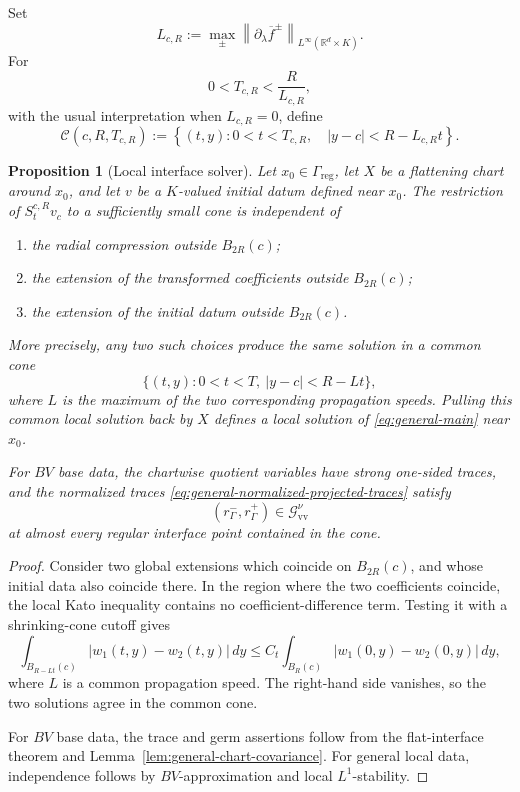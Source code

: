 \documentclass[11pt]{amsart}
\numberwithin{equation}{section}
\theoremstyle{plain}
\newtheorem{proposition}[theorem]{Proposition}
\theoremstyle{definition}
\theoremstyle{remark}
\begin{document}
Set
\begin{equation}
\label{eq:general-local-speed}
    L_{c,R}
    :=
    \max_\pm
    \left\|
        \partial_\lambda\overline f^\pm
    \right\|_{L^\infty(\mathbb R^d\times K)}.
\end{equation}
For
\[
    0<T_{c,R}<\frac{R}{L_{c,R}},
\]
with the usual interpretation when \(L_{c,R}=0\), define
\begin{equation}
\label{eq:general-local-cone}
    \mathcal C(c,R,T_{c,R})
    :=
    \left\{
        (t,y):
        0<t<T_{c,R},
        \quad
        |y-c|<R-L_{c,R}t
    \right\}.
\end{equation}

\begin{proposition}[Local interface solver]
\label{prop:general-local-solver}
Let \(x_0\in\Gamma_{\mathrm{reg}}\), let \(X\) be a flattening chart around
\(x_0\), and let \(v\) be a \(K\)-valued initial datum defined near \(x_0\).
The restriction of \(S_t^{c,R}v_c\) to a sufficiently small cone is
independent of

\begin{enumerate}
\item the radial compression outside \(B_{2R}(c)\);
\item the extension of the transformed coefficients outside \(B_{2R}(c)\);
\item the extension of the initial datum outside \(B_{2R}(c)\).
\end{enumerate}

More precisely, any two such choices produce the same solution in a common
cone
\[
    \{(t,y):0<t<T,\ |y-c|<R-Lt\},
\]
where \(L\) is the maximum of the two corresponding propagation speeds.
Pulling this common local solution back by \(X\) defines a local solution of
\eqref{eq:general-main} near \(x_0\).

For \(BV\) base data, the chartwise quotient variables have strong one-sided
traces, and the normalized traces
\eqref{eq:general-normalized-projected-traces} satisfy
\[
    (r_\Gamma^-,r_\Gamma^+)
    \in
    \mathcal G_{\mathrm{vv}}^\nu
\]
at almost every regular interface point contained in the cone.
\end{proposition}

\begin{proof}
Consider two global extensions which coincide on \(B_{2R}(c)\), and whose
initial data also coincide there. In the region where the two coefficients
coincide, the local Kato inequality contains no coefficient-difference term.
Testing it with a shrinking-cone cutoff gives
\[
\int_{B_{R-Lt}(c)}
    |w_1(t,y)-w_2(t,y)|
\,dy
\le
C_t
\int_{B_R(c)}
    |w_1(0,y)-w_2(0,y)|
\,dy,
\]
where \(L\) is a common propagation speed. The right-hand side vanishes, so
the two solutions agree in the common cone.

For \(BV\) base data, the trace and germ assertions follow from the
flat-interface theorem and Lemma~\ref{lem:general-chart-covariance}. For
general local data, independence follows by \(BV\)-approximation and local
\(L^1\)-stability.
\end{proof}
\end{document}
